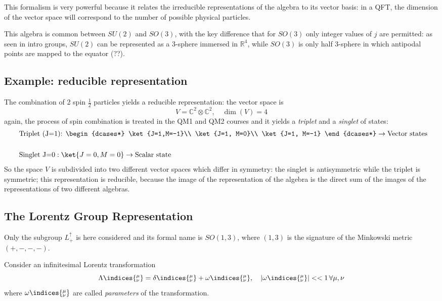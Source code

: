 This formalism is very powerful because it relates the irreducible representations
of the algebra to its vector basis: in a QFT, the dimension of the vector space
will correspond to the number of possible physical particles.

This algebra is common between $SU(2)$ and $SO(3)$, with the key difference that
for $SO(3)$ only integer values of $j$ are permitted: as seen in intro groups, $SU(2)$
can be represented as a 3-sphere immersed in $\mathbb{R}^4$, while $SO(3)$ is
only half 3-sphere in which antipodal points are mapped to the equator (??).

\subsection{Example: reducible representation}
The combination of 2 spin $\frac{1}{2}$ particles yields a reducible representation:
the vector space is
$$V = \mathbb{C}^2\otimes\mathbb{C}^2,\quad \dim(V)=4$$
again, the process of spin combination is treated in the QM1 and QM2 courses and it
yields a \textit{triplet} and a \textit{singlet} of states:
\begin{align*}
&\text{Triplet (J=1): }\begin{dcases*}
\ket{J=1,M=-1}\\
\ket{J=1, M=0}\\
\ket{J=1, M=-1}
\end{dcases*}\rightarrow\text{Vector states}\\
\phantom{x}\\
&\text{Singlet J=0}: \ket{J=0,M=0} \rightarrow\text{Scalar state}
\end{align*}
So the space $V$ is subdivided into two different vector spaces which differ in
symmetry: the singlet is antisymmetric while the triplet is symmetric; this
representation is reducible, because the image of the representation of the algebra
is the direct sum of the images of the representations of two different algebras.
\subsection{The Lorentz Group Representation}
Only the subgroup $L^\uparrow_+$ is here considered and its formal name is
$SO(1,3)$, where $(1,3)$ is the signature of the Minkowski metric $(+,-,-,-)$.

Consider an infinitesimal Lorentz transformation
$$\Lambda\indices{^\mu_\nu} = \delta\indices{^\mu_\nu}+\omega\indices{^\mu_\nu},\quad
|\omega\indices{^\mu_\nu}|<<1\,\forall\mu,\nu
$$
where $\omega\indices{^\mu_\nu}$ are called \textit{parameters} of the transformation.

